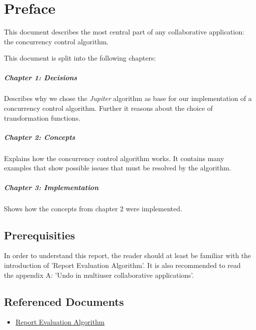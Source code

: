 \chapter*{Preface}
This document describes the most central part of any collaborative application: the concurrency control algorithm.

This document is split into the following chapters:

\paragraph{Chapter 1: Decisions} Describes why we chose the \emph{Jupiter} algorithm as base for our implementation of a concurrency control algorithm. Further it reasons about the choice of transformation functions.

\paragraph{Chapter 2: Concepts} Explains how the concurrency control algorithm works. It contains many examples that show possible issues that must be resolved by the algorithm.

\paragraph{Chapter 3: Implementation} Shows how the concepts from chapter 2 were implemented.

\section{Prerequisities}
In order to understand this report, the reader should at least be familiar with the introduction of 'Report Evaluation Algorithm'. It is also recommended to read the appendix A: 'Undo in multiuser collaborative applications'.

\section{Referenced Documents}
\begin{itemize}
 \item \href{http://ace.iserver.ch:81/repos/ace/ace/trunk/docs/pdf/algorithm.pdf}{Report Evaluation Algorithm}
\end{itemize}

